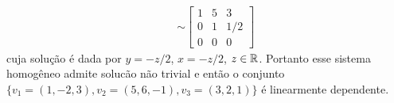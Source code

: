 \begin{exemplos}
\begin{enumerate}
\begin{align*}
\begin{array}{l}
				\end{array}\\&\sim
				\begin{bmatrix}
					1 & 5 & 3\\
					0 & 1 & 1/2\\
					0 & 0 & 0
				\end{bmatrix}
			\end{align*}
			cuja solução é dada por $y = -z/2$, $x =-z/2$, $z \in \mathbb{R}$. Portanto esse
			sistema homogêneo admite solucão não trivial e então o conjunto
			$\{v_1 = (1, -2, 3), v_2 = (5, 6, -1), v_3 = (3, 2, 1)\}$ é linearmente dependente.
	\end{enumerate}
\end{exemplos}

%
%
